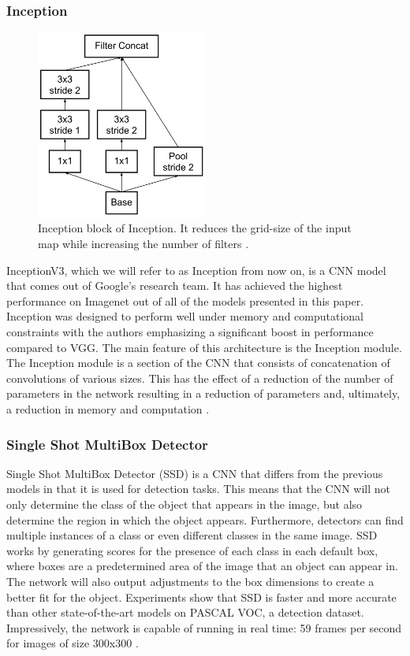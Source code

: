 \subsubsection{Inception}
\begin{figure}
    \centering
    \includegraphics[width=0.50\textwidth]{images/inception.png}
    \caption{Inception block of Inception. It reduces the grid-size of the input map while increasing the number of filters \cite{inception}.}
    \label{inception_block}
\end{figure}
InceptionV3, which we will refer to as Inception from now on, is a CNN model that comes out of Google's research team. It has achieved the highest performance on Imagenet out of all of the models presented in this paper. Inception was designed to perform well under memory and computational constraints with the authors emphasizing a significant boost in performance compared to VGG. The main feature of this architecture is the Inception module. The Inception module is a section of the CNN that consists of concatenation of convolutions of various sizes. This has the effect of a reduction of the number of parameters in the network resulting in a reduction of parameters and, ultimately, a reduction in memory and computation \cite{inception}.


\subsubsection{Single Shot MultiBox Detector}
Single Shot MultiBox Detector (SSD) is a CNN that differs from the previous models in that it is used for detection tasks. This means that the CNN will not only determine the class of the object that appears in the image, but also determine the region in which the object appears. Furthermore, detectors can find multiple instances of a class or even different classes in the same image. SSD works by generating scores for the presence of each class in each default box, where boxes are a predetermined area of the image that an object can appear in. The network will also output adjustments to the box dimensions to create a better fit for the object. Experiments show that SSD is faster and more accurate than other state-of-the-art models on PASCAL VOC, a detection dataset. Impressively, the network is capable of running in real time: 59 frames per second for images of size 300x300 \cite{ssd}.

